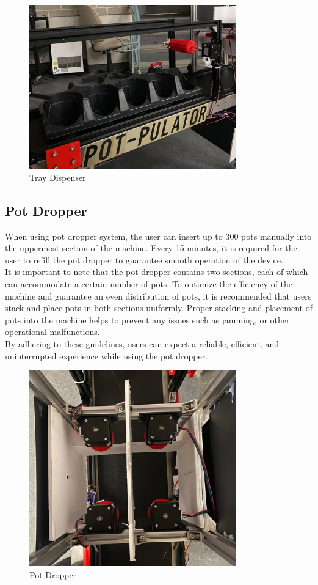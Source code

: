 \documentclass[12pt, titlepage]{article}
\begin{document}
\begin{figure}[H]
    \centering
    \includegraphics[width=0.8\textwidth]{tray.jpg}
    \caption{Tray Dispenser}
    \label{fig:scope}
  \end{figure}
\newpage
\subsection{Pot Dropper}
When using pot dropper system, the user can insert up to 300 pots manually into the uppermost section of the machine. Every 15 minutes, it is required for the user to refill the pot dropper to guarantee smooth operation of the device.
\\
\noindent It is important to note that the pot dropper contains two sections, each of which can accommodate a certain number of pots. To optimize the efficiency of the machine and guarantee an even distribution of pots, it is recommended that users stack and place pots in both sections uniformly. Proper stacking and placement of pots into the machine helps to prevent any issues such as jamming, or other operational malfunctions.
\\
\noindent By adhering to these guidelines, users can expect a reliable, efficient, and uninterrupted experience while using the pot dropper.

\begin{figure}[H]
    \centering
    \includegraphics[width=0.8\textwidth]{pot.jpg}
    \caption{Pot Dropper}
    \label{fig:scope}
  \end{figure}
\newpage
\end{document}
